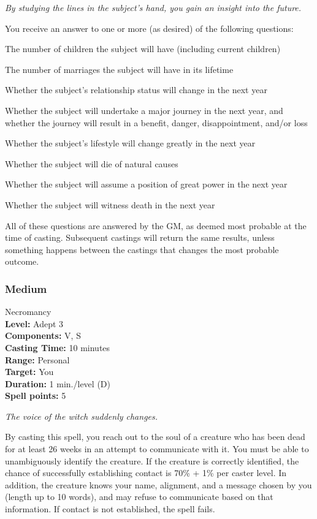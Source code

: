 \emph{By studying the lines in the subject's hand, you gain an insight into the future.}

You receive an answer to one or more (as desired) of the following questions:
\begin{list}{}{\leftmargin=1em}
 \item The number of children the subject will have (including current children)
 \item The number of marriages the subject will have in its lifetime
 \item Whether the subject's relationship status will change in the next year
 \item Whether the subject will undertake a major journey in the next year, and whether the journey will result in a benefit, danger, disappointment, and/or loss
 \item Whether the subject's lifestyle will change greatly in the next year
 \item Whether the subject will die of natural causes
 \item Whether the subject will assume a position of great power in the next year
 \item Whether the subject will witness death in the next year
\end{list}
All of these questions are answered by the GM, as deemed most probable at the time of casting. Subsequent castings will return the same results, unless something happens between the castings that changes the most probable outcome.

\subsubsection{Medium}
\label{Spell:Medium}
Necromancy
\\ \textbf{Level:} Adept 3
\\ \textbf{Components:} V, S
\\ \textbf{Casting Time:} 10 minutes
\\ \textbf{Range:} Personal
\\ \textbf{Target:} You
\\ \textbf{Duration:} 1 min./level (D)
\\ \textbf{Spell points:} 5

\emph{The voice of the witch suddenly changes.}

By casting this spell, you reach out to the soul of a creature who has been dead for at least 26 weeks in an attempt to communicate with it.
You must be able to unambiguously identify the creature. If the creature is correctly identified, the chance of successfully establishing contact is 70\% + 1\% per caster level. In addition, the creature knows your name, alignment, and a message chosen by you (length up to 10 words), and may refuse to communicate based on that information. If contact is not established, the spell fails. 

